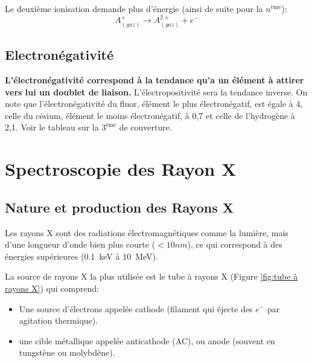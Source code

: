 \documentclass{article}
\begin{document}
Le deuxième ionisation demande plus d'énergie (ainsi de suite pour la $n^{\text{ème}}$): 
$$A^{+}_{(gaz)} \rightarrow A^{2+}_{(gaz)} + e^-$$

\vspace{1mm}
\hspace{0cm}\pgfPT[
    Z list=spd,
    CS all=darkgray,    
    csSoft,
    cell size=22pt, 
    show title=false, 
    show legend,
    show legend pins=false,
    name font=\Tiny,
    show periodic variations,
    cell style=pgfPTEi,
    varEi font=\footnotesize,    
    varR font=\footnotesize,
    varEi color=purple!50!white,
    Ei color=purple
    ]


\subsection{Electronégativité} \label{sous-section:Electronégativité}

\textbf{L'électronégativité correspond à la tendance qu'a un élément à attirer vers lui un doublet de liaison.} L'électropositivité sera la tendance inverse.
On note que l'électronégativité du fluor, élément le plus électronégatif, est égale à 4, celle 
du césium, élément le moins électronégatif, à 0,7 et celle de l'hydrogène à 2,1.
Voir le tableau sur la $3^{\text{ème}}$ de couverture.



\section{Spectroscopie des Rayon X}

\subsection{Nature et production des Rayons X}

Les rayons X sont des radiations électromagnétiques comme la lumière, mais d'une 
longueur d'onde bien plus courte ($<10 nm$), ce qui correspond à des 
énergies supérieures (\qty{0.1}{keV} à \qty{10}{MeV}).

La source de rayons X la plus utilisée est le tube à rayons X (Figure \ref{fig:tube à rayons X}) qui comprend:

\begin{itemize}[label=$\ast$]
    \item Une source d'électrons appelée cathode (filament qui éjecte des $e^-$ par agitation thermique).
    \item une cible métallique appelée anticathode (AC), ou anode (souvent en tungstène ou molybdène).
\end{itemize}
\end{document}

